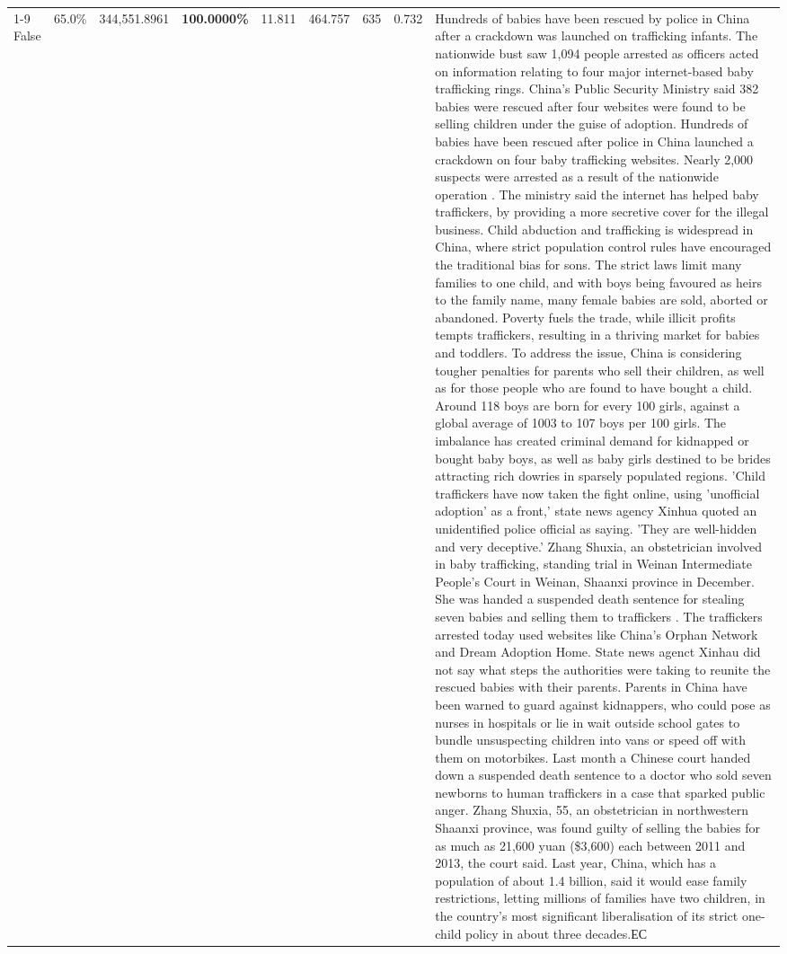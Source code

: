 \begin{table}[H]
\begin{tabular}{lllrlllll}
\cline{1-9}
False & 65.0\% & 344,551.8961 & \bfseries \color{red} 100.0000\% & 11.811 & 464.757 & 635 & 0.732 & Hundreds of babies have been rescued by police in China after a crackdown was launched on trafficking infants. The nationwide bust saw 1,094 people arrested as officers acted on information relating to four major internet-based baby trafficking rings. China's Public Security Ministry said 382 babies were rescued after four websites were found to be selling children under the guise of adoption. Hundreds of babies have been rescued after police in China launched a crackdown on four baby trafficking websites. Nearly 2,000 suspects were arrested as a result of the nationwide operation . The ministry said the internet has helped baby traffickers, by providing a more secretive cover for the illegal business. Child abduction and trafficking is widespread in China, where strict population control rules have encouraged the traditional bias for sons. The strict laws limit many families to one child, and with boys being favoured as heirs to the family name, many female babies are sold, aborted or abandoned. Poverty fuels the trade, while illicit profits tempts traffickers, resulting in a thriving market for babies and toddlers. To address the issue, China is considering tougher penalties for parents who sell their children, as well as for those people who are found to have bought a child. Around 118 boys are born for every 100 girls, against a global average of 1003 to 107 boys per 100 girls. The imbalance has created criminal demand for kidnapped or bought baby boys, as well as baby girls destined to be brides attracting rich dowries in sparsely populated regions. 'Child traffickers have now taken the fight online, using 'unofficial adoption' as a front,' state news agency Xinhua quoted an unidentified police official as saying. 'They are well-hidden and very deceptive.' Zhang Shuxia, an obstetrician involved in baby trafficking, standing trial in Weinan Intermediate People's Court in Weinan, Shaanxi province in December. She was handed a suspended death sentence for stealing seven babies and selling them to traffickers . The traffickers arrested today used websites like China's Orphan Network and Dream Adoption Home. State news agenct Xinhau did not say what steps the authorities were taking to reunite the rescued babies with their parents. Parents in China have been warned to guard against kidnappers, who could pose as nurses in hospitals or lie in wait outside school gates to bundle unsuspecting children into vans or speed off with them on motorbikes. Last month a Chinese court handed down a suspended death sentence to a doctor who sold seven newborns to human traffickers in a case that sparked public anger. Zhang Shuxia, 55, an obstetrician in northwestern Shaanxi province, was found guilty of selling the babies for as much as 21,600 yuan (\$3,600) each between 2011 and 2013, the court said. Last year, China, which has a population of about 1.4 billion, said it would ease family restrictions, letting millions of families have two children, in the country's most significant liberalisation of its strict one-child policy in about three decades.ЕС \\

\end{tabular}
\end{table}
